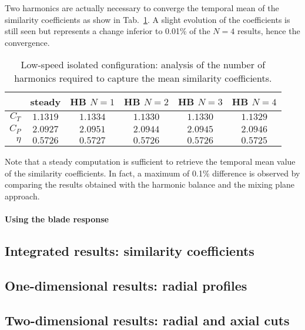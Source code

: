 Two harmonics are actually necessary to converge the temporal mean 
of the similarity coefficients as show 
in Tab.~\ref{tab:dream_ls_hb_conv_sim}. A slight evolution of the
coefficients is still seen but represents a change inferior to 0.01\%
of the $N=4$ results, hence the convergence. 
\begin{table}
   \centering
  \begin{tabular}{rccccc}
    \toprule
    & steady & HB $N=1$ & HB $N=2$ & HB $N=3$ & HB $N=4$ \\
    \midrule
    $C_T$  & $1.1319$ & $1.1334$ & $1.1330$ & $1.1330$ & $1.1329$ \\
    $C_P$  & $2.0927$ & $2.0951$ & $2.0944$ & $2.0945$ & $2.0946$ \\
    $\eta$ & $0.5726$ & $0.5727$ & $0.5726$ & $0.5726$ & $0.5725$ \\
    \bottomrule
  \end{tabular}
  \caption{Low-speed isolated configuration: analysis of the number of harmonics
  required to capture the mean similarity coefficients.}
  \label{tab:dream_ls_hb_conv_sim}
\end{table}
Note that a steady computation is sufficient to retrieve
the temporal mean value of the similarity coefficients.
In fact, a maximum of 0.1\% difference is observed by
comparing the results obtained with the harmonic balance and the
mixing plane approach.

\paragraph{Using the blade response}
\label{par:dream_ls_conv_hb_blade_response}

\subsection{Integrated results: similarity coefficients}
\label{sub:dream_ls_hb_sim_coeff}

\subsection{One-dimensional results: radial profiles}
\label{sub:dream_ls_hb_radial_profiles}

\subsection{Two-dimensional results: radial and axial cuts}
\label{sub:dream_ls_hb_axial_radial_cuts}
